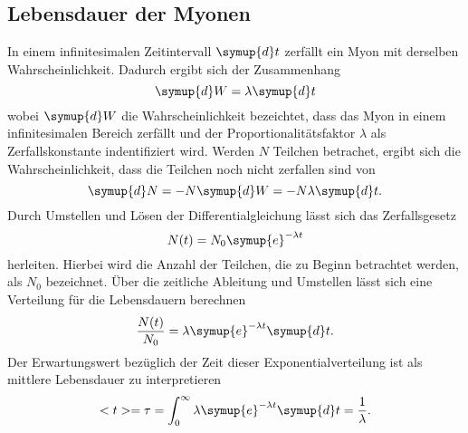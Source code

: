\subsection{Lebensdauer der Myonen}
\label{subsec:Lebensdauer der Myonen}
In einem infinitesimalen Zeitintervall $\symup{d}t$ zerfällt ein Myon mit derselben Wahrscheinlichkeit. Dadurch ergibt sich der Zusammenhang
\begin{equation*}
    \symup{d}W = \lambda \symup{d}t
\end{equation*}
wobei $\symup{d}W$ die Wahrscheinlichkeit bezeichtet, dass das Myon in einem infinitesimalen Bereich zerfällt und der Proportionalitätsfaktor $\lambda$ als Zerfallskonstante
indentifiziert wird.
Werden $N$ Teilchen betrachet, ergibt sich die Wahrscheinlichkeit, dass die Teilchen noch nicht zerfallen sind von
\begin{equation*}
    \symup{d}N = -N \symup{d}W = -N \lambda \symup{d}t.
\end{equation*} 
Durch Umstellen und Lösen der Differentialgleichung lässt sich das Zerfallsgesetz
\begin{equation*}
    N(t)=N_0\symup{e}^{-\lambda t}
\end{equation*}
herleiten. Hierbei wird die Anzahl der Teilchen, die zu Beginn betrachtet werden, als $N_0$ bezeichnet. Über die zeitliche Ableitung und Umstellen lässt sich eine Verteilung für
die Lebensdauern berechnen
\begin{equation*}
    \frac{N(t)}{N_0}=\lambda\symup{e}^{-\lambda t} \symup{d}t.
\end{equation*}
Der Erwartungswert bezüglich der Zeit dieser Exponentialverteilung ist als mittlere Lebensdauer zu interpretieren
\begin{equation}
    <t> = \tau = \int_0^\infty \lambda\symup{e}^{-\lambda t} \symup{d}t = \frac{1}{\lambda}.
    \label{eq:Lebensdauer}
\end{equation}
